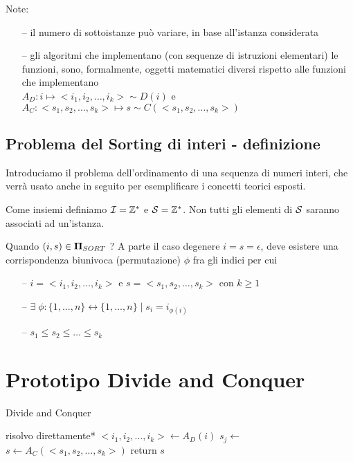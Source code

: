 Note:
\begin{itemize}[noitemsep,parsep=0pt,partopsep=0pt]
    \item[--] il numero di sottoistanze può variare, in base all'istanza considerata
    \item[--] gli algoritmi che implementano (con sequenze di istruzioni elementari) le funzioni, sono, formalmente, oggetti matematici diversi rispetto alle funzioni che implementano \\
        $ A_D : i \mapsto <i_1, i_2, \dots, i_k> \sim D(i)$ e $ A_C : <s_1, s_2, \dots, s_k> \mapsto s \sim C(<s_1, s_2, \dots, s_k>) $
\end{itemize}

\subsection{Problema del Sorting di interi - definizione}

Introduciamo il problema dell'ordinamento di una sequenza di numeri interi, che verrà usato anche in seguito per esemplificare i concetti teorici esposti.

Come insiemi definiamo $\mathcal{I}{} = \mathbb{Z}^* $ e $\mathcal{S}{} = \mathbb{Z}^* $. Non tutti gli elementi di $\mathcal{S}{}$ saranno associati ad un'istanza.

Quando $ (i,s) \in \bm{\Pi}{}_{SORT} $ ? A parte il caso degenere $i=s=\epsilon$, deve esistere una corrispondenza biunivoca (permutazione) $\phi$ fra gli indici per cui
\begin{itemize}[noitemsep,parsep=0pt,partopsep=0pt]
    \item[--] $i = <i_1, i_2, \dots, i_k> $ e $ s = <s_1, s_2, \dots, s_k> $ con $k \geq 1$
    \item[--] $ \exists \;\phi:\{1, \dots, n\} \leftrightarrow \{1, \dots, n\} \;|\; s_i = i_{\phi(i)}$
    \item[--] $ s_1 \leq s_2 \leq \dots \leq s_k$ 
\end{itemize}

\section{Prototipo Divide and Conquer}

\begin{algorithm}[H]
\caption{Divide and Conquer}\label{alg:dnc}
\begin{algorithmic}[1]
                                     
            \State *risolvo direttamente*
        \EndIf
        \State $<i_1, i_2, \dots, i_k> \gets A_D(i)$    
                            
            \State $s_j \gets $ 
        \EndFor
        \State $s \gets A_C(<s_1, s_2, \dots, s_k>)$    
        \State return $s$
    \EndProcedure
\end{algorithmic}
\end{algorithm}


